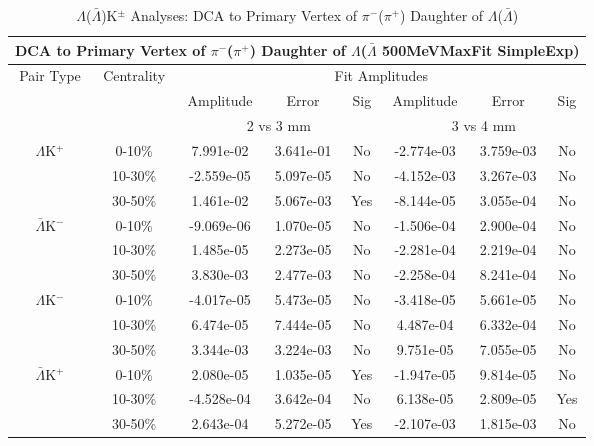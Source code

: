 \documentclass[../AnalysisNoteJBuxton.tex]{subfiles}
\begin{document}
\begin{table}
 \centering
 \begin{tabular}{|c|c|c|c|c||c|c|c|}
  \multicolumn{8}{c}{DCA to Primary Vertex of $\pi^{-}$($\pi^{+}$) Daughter of $\Lambda$($\bar{\Lambda}$ 500MeVMaxFit SimpleExp)} \\
  \hline
  \multirow{3}{*}{Pair Type} & \multirow{3}{*}{Centrality} & \multicolumn{6}{c|}{Fit Amplitudes} \\
  \cline{3-8}
   & & Amplitude & Error & Sig & Amplitude & Error & Sig \\  
  \cline{3-8}
   & & \multicolumn{3}{c||}{2 vs 3 mm} & \multicolumn{3}{c|}{3 vs 4 mm} \\  
  \hline
  \multirow{3}{*}{$\Lambda$K$^{+}$}
   &  0-10\% & 7.991e-02 & 3.641e-01 & No & -2.774e-03 & 3.759e-03 & No \\
   & 10-30\% & -2.559e-05 & 5.097e-05 & No & -4.152e-03 & 3.267e-03 & No \\
   & 30-50\% & 1.461e-02 & 5.067e-03 & Yes & -8.144e-05 & 3.055e-04 & No \\
  \hline
  \multirow{3}{*}{$\bar{\Lambda}$K$^{-}$}
   &  0-10\% & -9.069e-06 & 1.070e-05 & No & -1.506e-04 & 2.900e-04 & No \\
   & 10-30\% & 1.485e-05 & 2.273e-05 & No & -2.281e-04 & 2.219e-04 & No \\
   & 30-50\% & 3.830e-03 & 2.477e-03 & No & -2.258e-04 & 8.241e-04 & No \\
  \hline \hline
  \multirow{3}{*}{$\Lambda$K$^{-}$}
   &  0-10\% & -4.017e-05 & 5.473e-05 & No & -3.418e-05 & 5.661e-05 & No \\
   & 10-30\% & 6.474e-05 & 7.444e-05 & No & 4.487e-04 & 6.332e-04 & No \\
   & 30-50\% & 3.344e-03 & 3.224e-03 & No & 9.751e-05 & 7.055e-05 & No \\
  \hline
  \multirow{3}{*}{$\bar{\Lambda}$K$^{+}$}
   &  0-10\% & 2.080e-05 & 1.035e-05 & Yes & -1.947e-05 & 9.814e-05 & No \\
   & 10-30\% & -4.528e-04 & 3.642e-04 & No & 6.138e-05 & 2.809e-05 & Yes \\
   & 30-50\% & 2.643e-04 & 5.272e-05 & Yes & -2.107e-03 & 1.815e-03 & No \\
  \hline
 \end{tabular}
 \caption{$\Lambda$($\bar{\Lambda}$)K$^{\pm}$ Analyses: DCA to Primary Vertex of $\pi^{-}$($\pi^{+}$) Daughter of $\Lambda$($\bar{\Lambda}$)}
 \label{tab:DcaToPrimVertexPionDaughtOfLamLamKch_500MeVMaxFit_SimpleExp}
\end{table}
\end{document}
